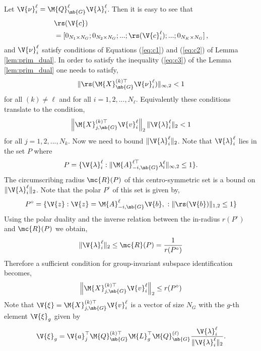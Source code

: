 \documentclass[conference]{IEEEtran}
\begin{document}
Let $\V{\nu}_i^\ell = \M{Q}_{\mb{G}}^{\ell} \V{\lambda}_i^\ell$.  Then it is easy to see that 
\begin{align*}
&\rs(\V{c}) \nonumber \\
& = [ 0_{N_1 \times N_G}; 0_{N_2 \times N_G};...; \rs(\V{c}_i^\ell); ...; 0_{N_{K} \times N_G} ]\, ,
\end{align*} 
and $\V{\nu}_{i}^{\ell}$ satisfy conditions of Equations (\ref{eq:c1}) and (\ref{eq:c2}) of Lemma \ref{lem:prim_dual}. In order to satisfy the inequality (\ref{eq:c3}) of the Lemma \ref{lem:prim_dual} one needs to satisfy,
\begin{align}
\| \rs(\M{X}_{\mb{G}}^{(k)\top} {\V{\nu}}_i^\ell)\|_{\infty,2} < 1
\end{align}
for all $(k) \neq \ell$ and for all $i= 1, 2, ..., N_\ell$.  Equivalently these conditions translate to the condition, 
\begin{align}
\left\| \M{X}_{j,\mb{G}}^{(k) \top} \V{v}_i^\ell\right\|_{2} \|\V{\lambda}_i^\ell \|_2< 1
\end{align}
for all $j = 1,2,...,N_k$. Now we need to bound $\|\V{\lambda}_i^\ell \|_2$. Note that $\V{\lambda}_i^\ell$ lies in the set $P$ where 
\begin{align} 
P = \{ \V{\lambda}_{i}^{\ell}: \|\M{A}_{-i, \mb{G}}^{\ell \top} \lambda_i^\ell\|_{\infty,2} \leq 1\}.
\end{align} 
The circumscribing radius $\mc{R}(P)$ of this centro-symmetric set is a bound on $\|\V{\lambda}_i^\ell \|_2$. Note that the polar $P^\circ$ of this set is given by, 
\begin{align} 
P^\circ = \{ \V{z}: \V{z} = \M{A}_{-i, \mb{G}}^{\ell} \V{b},\,\, : \|\rs(\V{b})\|_{1,2} \leq 1\}
\end{align} 
Using the polar duality \cite{Rockafellar} and the inverse relation between the in-radius $r(P^\circ)$ and $\mc{R}(P)$ \cite{Soltanolkotabi:2012ia} we obtain, 
\begin{align} 
\|\V{\lambda}_i^\ell \|_2 \leq \mc{R}(P) = \frac{1}{r(P^\circ)}
\end{align} 
Therefore a sufficient condition for group-invariant subspace identification becomes, 
\begin{align} 
\label{eq:cond1}
\left\|\M{X}_{j,\mb{G}}^{(k) \top} \V{v}_i^\ell \right\|_{2} \leq r(P^\circ)
\end{align}
Note that $\V{\xi} = \M{X}_{j,\mb{G}}^{(k) \top} \V{v}_i^\ell$ is a vector of size $N_G$ with the $g$-th element $\V{\xi}_g$ given by $$\V{\xi}_g = \V{a}_j^\top \M{Q}_{\mb{G}}^{(k)\top} \M{L}_g^\top  \M{Q}_{\mb{G}}^{(\ell)}\frac{\V{\lambda}_i^\ell}{\|\V{\lambda}_i^\ell \|_2}.$$ 
 
\end{document}
